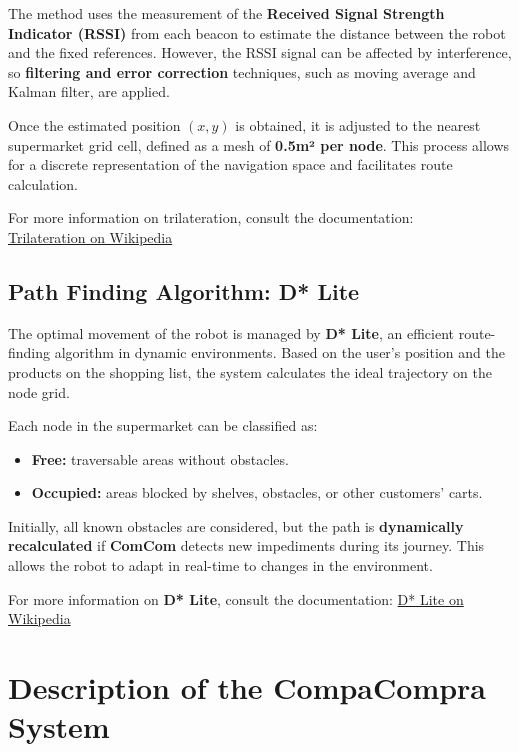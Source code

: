 \documentclass[a4paper,11pt]{article}
\begin{document}
The method uses the measurement of the \textbf{Received Signal Strength 
Indicator (RSSI)} from each beacon to estimate the distance between the 
robot and the fixed references. However, the RSSI signal can be affected 
by interference, so \textbf{filtering and error correction} techniques, 
such as moving average and Kalman filter, are applied.

Once the estimated position \((x, y)\) is obtained, it is adjusted to 
the nearest supermarket grid cell, defined as a mesh of \textbf{0.5m² 
per node}. This process allows for a discrete representation of the 
navigation space and facilitates route calculation.

For more information on trilateration, consult the documentation: \\
\href{https://en.wikipedia.org/wiki/Trilateration}{Trilateration on Wikipedia}
\parencite{trilateration-wikipedia}

\subsection{Path Finding Algorithm: D* Lite}
The optimal movement of the robot is managed by \textbf{D* Lite}, an 
efficient route-finding algorithm in dynamic environments. Based on 
the user's position and the products on the shopping list, the system 
calculates the ideal trajectory on the node grid.

Each node in the supermarket can be classified as:
\begin{itemize}
\item \textbf{Free:} traversable areas without obstacles.
\item \textbf{Occupied:} areas blocked by shelves, obstacles, or other 
customers' carts.
\end{itemize}

Initially, all known obstacles are considered, but the path is 
\textbf{dynamically recalculated} if \textbf{ComCom} detects 
new impediments during its journey. This allows the robot to adapt 
in real-time to changes in the environment.

For more information on \textbf{D* Lite}, consult the documentation:
\href{https://en.wikipedia.org/wiki/D*_Lite}{D* Lite on Wikipedia} 
\parencite{dstar-lite-wikipedia} %

\section{Description of the CompaCompra System}
\end{document}
